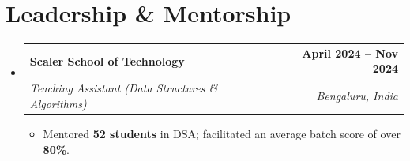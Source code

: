 \documentclass[A4,10pt]{article}
\makeatletter
\newcommand{\resumeItem}[1]{
  \item\small{#1 \vspace{-2pt}}
}
\newcommand{\resumeSubheading}[4]{
  \vspace{-2pt}\item
    \begin{tabular*}{1.0\textwidth}[t]{l@{\extracolsep{\fill}}r}
      \textbf{#1} & \textbf{\small #2} \\
      \textit{\small#3} & \textit{\small #4} \\
    \end{tabular*}\vspace{-7pt}
}
\newcommand{\resumeSubHeadingListStart}{\begin{itemize}[leftmargin=0.0in, label={}]}
\newcommand{\resumeSubHeadingListEnd}{\end{itemize}}
\newcommand{\resumeItemListStart}{\begin{itemize}[leftmargin=0.15in]}
\newcommand{\resumeItemListEnd}{\end{itemize}\vspace{-5pt}}
\makeatother
\begin{document}
\section{Leadership \& Mentorship}
\resumeSubHeadingListStart

  \resumeSubheading
    {Scaler School of Technology}{April 2024 -- Nov 2024}
    {Teaching Assistant (Data Structures \& Algorithms)}{Bengaluru, India}
    \resumeItemListStart
      \resumeItem{Mentored \textbf{52 students} in DSA; facilitated an average batch score of over \textbf{80\%}.}
    \resumeItemListEnd

\resumeSubHeadingListEnd
\end{document}

